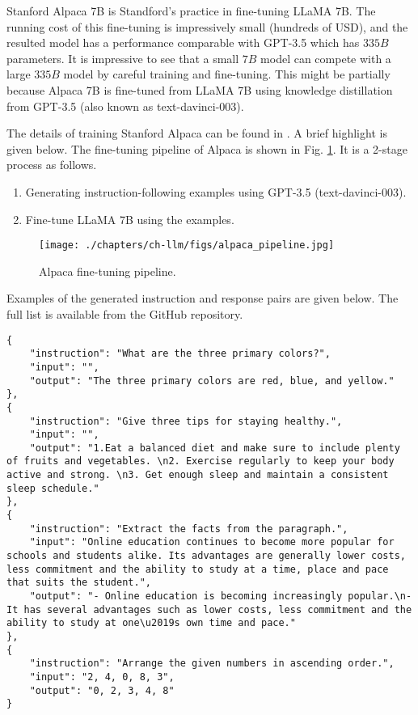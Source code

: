 Stanford Alpaca 7B is Standford's practice in fine-tuning LLaMA 7B. The running cost of this fine-tuning is impressively small (hundreds of USD), and the resulted model has a performance comparable with GPT-3.5 which has $335B$ parameters. It is impressive to see that a small $7B$ model can compete with a large $335B$ model by careful training and fine-tuning. This might be partially because Alpaca 7B is fine-tuned from LLaMA 7B using knowledge distillation from GPT-3.5 (also known as text-davinci-003).

The details of training Stanford Alpaca can be found in \cite{alpaca}. A brief highlight is given below. The fine-tuning pipeline of Alpaca is shown in Fig. \ref{fig:alpaca_pipeline}. It is a 2-stage process as follows.
\begin{enumerate}
	\item Generating instruction-following examples using GPT-3.5 (text-davinci-003).
	\item Fine-tune LLaMA 7B using the examples.
\end{enumerate}
\begin{figure}[tbp]
	\centering
	\texttt{[image: ./chapters/ch-llm/figs/alpaca\_pipeline.jpg]}
	\caption{Alpaca fine-tuning pipeline.}
	\label{fig:alpaca_pipeline}
\end{figure}

Examples of the generated instruction and response pairs are given below. The full list is available from the GitHub repository.
\begin{lstlisting}
{
	"instruction": "What are the three primary colors?",
	"input": "",
	"output": "The three primary colors are red, blue, and yellow."
},
{
	"instruction": "Give three tips for staying healthy.",
	"input": "",
	"output": "1.Eat a balanced diet and make sure to include plenty of fruits and vegetables. \n2. Exercise regularly to keep your body active and strong. \n3. Get enough sleep and maintain a consistent sleep schedule."
},
{
	"instruction": "Extract the facts from the paragraph.",
	"input": "Online education continues to become more popular for schools and students alike. Its advantages are generally lower costs, less commitment and the ability to study at a time, place and pace that suits the student.",
	"output": "- Online education is becoming increasingly popular.\n- It has several advantages such as lower costs, less commitment and the ability to study at one\u2019s own time and pace."
},
{
	"instruction": "Arrange the given numbers in ascending order.",
	"input": "2, 4, 0, 8, 3",
	"output": "0, 2, 3, 4, 8"
}
\end{lstlisting}


